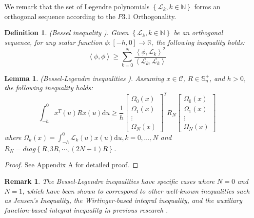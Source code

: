 \documentclass[a4paper]{cas-sc}
\newtheorem{lemma}[theorem]{Lemma}
\newtheorem*{proof}{Proof}
\newtheorem{remark}[theorem]{Remark}
\newtheorem{defi}[theorem]{Definition}
\begin{document}
We remark that the set of Legendre polynomials $\left\{ {{\mathcal{L}_k},k \in \mathbb{N}} \right\}$ forms an orthogonal sequence according to the $P3.1$ Orthogonality.

\begin{defi}
  (Bessel inequality \citep{dragomir2001note}). Given $\left\{ {{\mathcal{L}_k},k \in \mathbb{N}} \right\} $ be an orthogonal sequence, for any scalar function $\phi :\left[ { - h,0} \right] \to \mathbb{R} $, the following inequality holds:
  \begin{equation}
    \left\langle {\phi ,\phi } \right\rangle  \geqslant \sum\limits_{k = 0}^N {\frac{{{{\left\langle {\phi ,{\mathcal{L}_k}} \right\rangle }^2}}}{{\left\langle {{\mathcal{L}_k},{\mathcal{L}_k}} \right\rangle }}}
  \end{equation}
\end{defi}

\begin{lemma}
  \label{lemma5}
  (Bessel-Legendre inequalities \citep{Lee2018}). Assuming $x \in \mathcal{C} $, $R \in \mathbb{S}_n^ +  $, and $h > 0$, the following inequality holds:
  \begin{equation}
    \int_{ - h}^0 {{x^T}} (u)Rx(u){\text{d}}u \geqslant \frac{1}{h}{\left[ {\begin{array}{*{20}{c}}
              {{\Omega _0}(x)} \\
              {{\Omega _1}(x)} \\
              \vdots           \\
              {{\Omega _N}(x)}
            \end{array}} \right]^T}{R_N}\left[ {\begin{array}{*{20}{c}}
            {{\Omega _0}(x)} \\
            {{\Omega _1}(x)} \\
            \vdots           \\
            {{\Omega _N}(x)}
          \end{array}} \right]
    \label{eqlemma5}
  \end{equation}
  where ${\Omega _k}(x) = \int_{ - h}^0 {{\mathcal{L}_k}} (u)x(u){\text{d}}u,k = 0, \ldots ,N$ and ${R_N} = diag\left\{ {R,3R, \cdots ,(2N + 1)R} \right\}$.
\end{lemma}
\begin{proof}
  See Appendix A for detailed proof.
\end{proof}

\begin{remark}
  The Bessel-Legendre inequalities have specific cases where $N=0$ and $N=1$, which have been shown to correspond to other well-known inequalities such as Jensen's Inequality, the Wirtinger-based integral inequality, and the auxiliary function-based integral inequality in previous research \citep{Seuret2013, Park2015}.
\end{remark}
\end{document}
